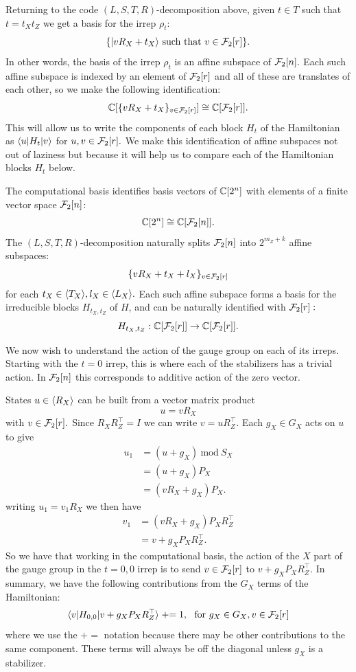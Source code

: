 \documentclass[12pt]{article}
\renewenvironment{framed}[1][\hsize]{%
\def\FrameCommand{{\color{black}\vrule width 3pt}\hspace{0pt}\fboxsep=\FrameSep\colorbox{lightgray}}%
\MakeFramed{\hsize0.8\linewidth\advance\hsize-\width\FrameRestore}}
{\endMakeFramed}
\begin{document}
Returning to the code $(L,S,T,R)$-decomposition
above,
given $t\in T$ such that $t = t_X t_Z$
we get a basis for the irrep $\rho_t$:
$$
    \{ |{v R_X + t_X}\rangle \ \mbox{such that}\  v \in \mathcal{F}_2[r] \}.
$$
In other words,
the basis of the irrep $\rho_t$ is 
an affine subspace of $\mathcal{F}_2[n].$
Each such affine subspace is indexed by an
element of $\mathcal{F}_2[r]$ and
all of these are
translates of each other,
so we make the following identification:
$$
\mathbb{C}[\{vR_X+t_X\}_{v\in\mathcal{F}_2[r]}]
\cong \mathbb{C}[\mathcal{F}_2[r]].
$$
This will allow us to write the components
of each block $H_t$ of the Hamiltonian
as $\langle{u}|H_t|{v}\rangle$ for $u,v\in\mathcal{F}_2[r].$
We make this identification of affine subspaces
not out of laziness but because it will
help us to compare each of
the Hamiltonian blocks $H_t$ below.

\begin{framed}
The computational basis identifies
basis vectors of $\mathbb{C}[2^n]$
with elements of a finite vector space $\mathcal{F}_2[n]$:
$$
    \mathbb{C}[2^n] \cong \mathbb{C}[\mathcal{F}_2[n]].
$$
The $(L,S,T,R)$-decomposition naturally
splits $\mathcal{F}_2[n]$ into $2^{m_Z+k}$ affine subspaces:
$$
    \{ v R_X + t_X + l_X \}_{v\in\mathcal{F}_2[r]}
$$
for each $t_X \in \langle T_X \rangle, l_X \in \langle L_X \rangle.$
Each such affine subspace forms a basis
for the irreducible blocks $H_{t_X,t_Z}$ of $H$,
and can be naturally identified with $\mathcal{F}_2[r]:$
$$
    H_{t_X,t_Z} : \mathbb{C}[\mathcal{F}_2[r]] \to \mathbb{C}[\mathcal{F}_2[r]].
$$
\end{framed}

We now wish to understand the action of the
gauge group on each of its irreps.
Starting with the $t=0$ irrep,
this is where each of the stabilizers has
a trivial action. 
In $\mathcal{F}_2[n]$ this
corresponds to additive action of the zero vector.

\newcommand{\pluseq}{\mathrel{+}=}
States $u\in\langle R_X \rangle$ can be built from a
vector matrix product
$$
    u = v R_X
$$
with $v\in\mathcal{F}_2[r].$
Since $R_X R_Z^\top = I$
we can write $v = u R_Z^\top.$
Each $g_X\in G_X$ acts on $u$ to give
\begin{align*}
    u_1 &= (u + g_X) \ \mbox{mod}\  S_X \\
        &= (u + g_X) P_X \\
        &= (v R_X + g_X) P_X.
\end{align*}
writing $u_1 = v_1 R_X$ we then have
\begin{align*}
    v_1 &= (v R_X + g_X) P_X R_Z^\top \\
        &= v + g_X P_X R_Z^\top.
\end{align*}
So we have that working in the computational
basis, the action of the $X$ part of the
gauge group in the $t=0,0$ irrep is to send
$v\in \mathcal{F}_2[r]$ to $v + g_X P_X R_Z^\top.$
In summary, we have the following contributions from the
$G_X$ terms of the Hamiltonian:
$$
    \bra{v} H_{0,0} \ket{v+g_X P_X R_Z^\top} 
        \pluseq 1,\ \ \mbox{for}\ g_X\in G_X, v\in \Fr
$$
where we use the $\pluseq$ notation
because there may be other contributions to the
same component.
These terms will always be off
the diagonal unless $g_X$ is a stabilizer.
\end{document}
